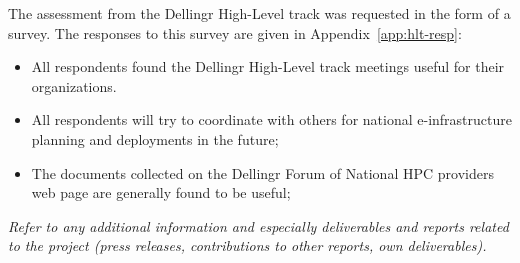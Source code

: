 \documentclass{article}
\newcommand{\dell}{Dellingr\xspace}
\newcommand{\einfra}{e-infrastructure\xspace}
\newcommand{\HLT}{High-Level track\xspace}
\begin{document}
The assessment from the \dell \HLT was requested in the form of a survey.
The responses to this survey are given in Appendix~\ref{app:hlt-resp}:
\begin{itemize}
\item All respondents found the \dell \HLT meetings useful for their organizations.
\item All respondents will try to coordinate with others for national \einfra planning and deployments in the future;
\item The documents collected on the \dell Forum of National HPC providers web page are generally found to be useful;
\end{itemize}



\newpage
{\it Refer to any additional information and especially deliverables and reports related to the project (press releases, contributions to other reports, own deliverables).}
{}

\end{document}
